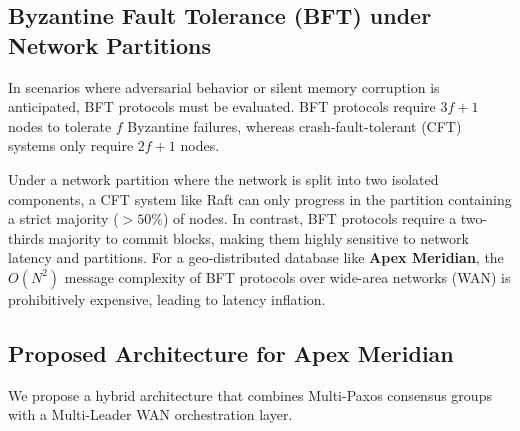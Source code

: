 \subsection{Byzantine Fault Tolerance (BFT) under Network Partitions}

In scenarios where adversarial behavior or silent memory corruption is anticipated, BFT protocols must be evaluated. BFT protocols require $3f + 1$ nodes to tolerate $f$ Byzantine failures, whereas crash-fault-tolerant (CFT) systems only require $2f + 1$ nodes. 

Under a network partition where the network is split into two isolated components, a CFT system like Raft can only progress in the partition containing a strict majority ($> 50\%$) of nodes. In contrast, BFT protocols require a two-thirds majority to commit blocks, making them highly sensitive to network latency and partitions. For a geo-distributed database like \textbf{Apex Meridian}, the $O(N^2)$ message complexity of BFT protocols over wide-area networks (WAN) is prohibitively expensive, leading to latency inflation.

\subsection{Proposed Architecture for Apex Meridian}

We propose a hybrid architecture that combines Multi-Paxos consensus groups with a Multi-Leader WAN orchestration layer. 

